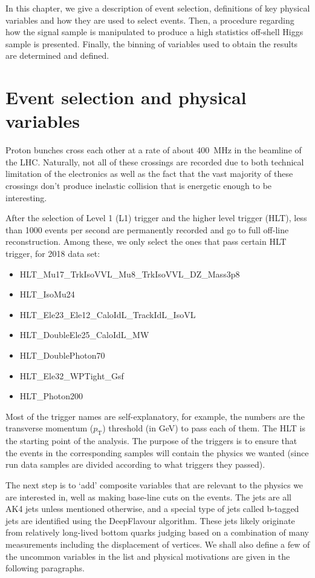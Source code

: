 In this chapter, we give a description of event selection, definitions of
key physical variables and how they are used to select events. Then, a procedure regarding
how the signal sample is manipulated to produce a high statistics off-shell Higgs sample is presented.
Finally, the binning of variables used to obtain the results are determined and defined.

\section{Event selection and physical variables}
Proton bunches cross each other at a rate of about \SI{400}{\mega\hertz} in the beamline of
the LHC. Naturally, not all of these crossings are recorded due to both technical
limitation of the electronics as well as the fact that the vast majority of these
crossings don't produce inelastic collision that is energetic enough to be interesting.

After the selection of Level 1 (L1) trigger and the higher level trigger (HLT), less than 1000
events per second are permanently recorded and go to full off-line reconstruction. Among these,
we only select the ones that pass certain HLT trigger, for 2018 data set:
\begin{itemize}
    \item HLT\_Mu17\_TrkIsoVVL\_Mu8\_TrkIsoVVL\_DZ\_Mass3p8
    \item HLT\_IsoMu24
    \item HLT\_Ele23\_Ele12\_CaloIdL\_TrackIdL\_IsoVL
    \item HLT\_DoubleEle25\_CaloIdL\_MW
    \item HLT\_DoublePhoton70
    \item HLT\_Ele32\_WPTight\_Gsf
    \item HLT\_Photon200
\end{itemize}
Most of the trigger names are self-explanatory, for example, the numbers are the transverse momentum ($p_\mathrm{T}$)
threshold (in \si{\giga\electronvolt}) to pass each of them. The HLT is the starting point of the analysis. The
purpose of the triggers is to ensure that the events in the corresponding samples will contain the physics
we wanted (since run data samples are divided according to what triggers they passed).

The next step is to `add' composite variables that are relevant to the physics we are interested in,
well as making base-line cuts on the events.
The jets are all AK4 jets unless mentioned otherwise, and a special type of jets called b-tagged
jets are identified using the DeepFlavour algorithm.\cite{deepflavour} These jets
likely originate from relatively long-lived bottom quarks judging based on a combination of many measurements 
including the displacement of vertices.
We shall also define a few of the
uncommon variables in the list and physical motivations are given in the following
paragraphs.


